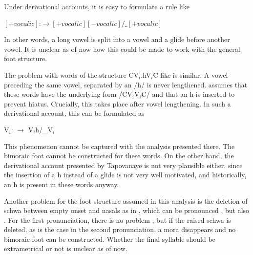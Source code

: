 Under derivational accounts, it is easy to formulate a rule like
% 

\ea $[+vocalic]$:$ \to [+vocalic][-vocalic]/\_[+vocalic]$\z

In other words, a long vowel is split into a vowel and a glide before another vowel. It is unclear as of now how this could be made to work with the general foot structure.

The problem with words of the structure CV$_i$.hV$_i$C	like  is similar. A vowel preceding the same vowel, separated by an /h/ is never lengthened. \citet{Tapovanaye1995} assumes that these words have the underlying form /CV$_i$V$_i$C/ and that an h is inserted to prevent hiatus. Crucially, this takes place after vowel lengthening. In such a derivational account, this can be formulated as

\ea V$_i$: $\to$ V$_i$h/\_V$_i$\z

This phenomenon cannot be captured with the analysis presented there. The bimoraic foot cannot be constructed for these words. On the other hand, the derivational account presented by Tapovanaye is not very plausible either, since the insertion of a h instead of a glide is not very well motivated, and historically, an h is present in these words anyway. 

Another problem for the foot structure assumed in this analysis is the deletion of schwa between empty onset and nasals as in , which can be pronounced , but also . For the first pronunciation, there is no problem , but if the raised schwa is deleted, as is the case in the second pronunciation, a mora disappears and no bimoraic foot can be constructed. Whether the final syllable should be extrametrical  or not  is unclear as of now.



